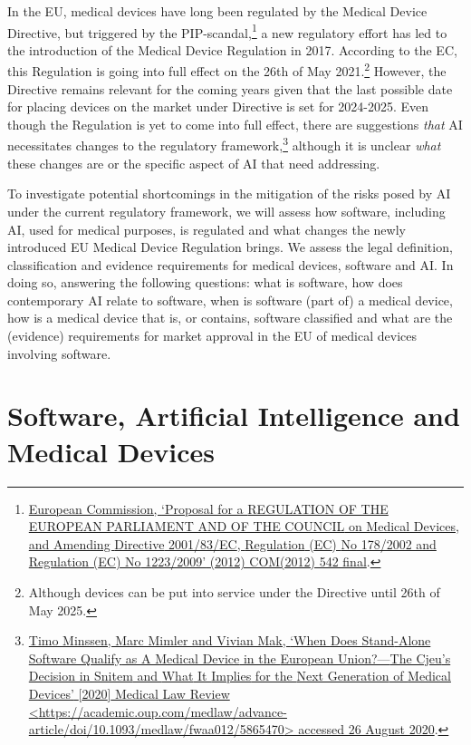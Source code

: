 \documentclass[
]{scrartcl}
\begin{document}
In the EU, medical devices have long been regulated by the Medical Device Directive, but triggered by the PIP-scandal,\footnote{\protect\hyperlink{ref-europeancommissionProposalREGULATIONEUROPEAN2012}{European Commission, {`Proposal for a {REGULATION OF THE EUROPEAN PARLIAMENT AND OF THE COUNCIL} on Medical Devices, and Amending {Directive} 2001/83/{EC}, {Regulation} ({EC}) {No} 178/2002 and {Regulation} ({EC}) {No} 1223/2009'} (2012) COM(2012) 542 final}.} a new regulatory effort has led to the introduction of the Medical Device Regulation in 2017. According to the EC, this Regulation is going into full effect on the 26th of May 2021.\footnote{Although devices can be put into service under the Directive until 26th of May 2025.} However, the Directive remains relevant for the coming years given that the last possible date for placing devices on the market under Directive is set for 2024-2025. Even though the Regulation is yet to come into full effect, there are suggestions \emph{that} AI necessitates changes to the regulatory framework,\footnote{\protect\hyperlink{ref-minssenWhenDoesStandAlone2020a}{Timo Minssen, Marc Mimler and Vivian Mak, {`When {Does Stand}-{Alone Software Qualify} as {A Medical Device} in the {European Union}?---{The Cjeu}'s {Decision} in {Snitem} and {What} It {Implies} for the {Next Generation} of {Medical Devices}'} {[}2020{]} Medical Law Review \textless{}\url{https://academic.oup.com/medlaw/advance-article/doi/10.1093/medlaw/fwaa012/5865470}\textgreater{} accessed 26 August 2020}.} although it is unclear \emph{what} these changes are or the specific aspect of AI that need addressing.

To investigate potential shortcomings in the mitigation of the risks posed by AI under the current regulatory framework, we will assess how software, including AI, used for medical purposes, is regulated and what changes the newly introduced EU Medical Device Regulation brings. We assess the legal definition, classification and evidence requirements for medical devices, software and AI. In doing so, answering the following questions: what is software, how does contemporary AI relate to software, when is software (part of) a medical device, how is a medical device that is, or contains, software classified and what are the (evidence) requirements for market approval in the EU of medical devices involving software.

\hypertarget{software-artificial-intelligence-and-medical-devices}{%
\section{Software, Artificial Intelligence and Medical Devices}\label{software-artificial-intelligence-and-medical-devices}}
\end{document}
